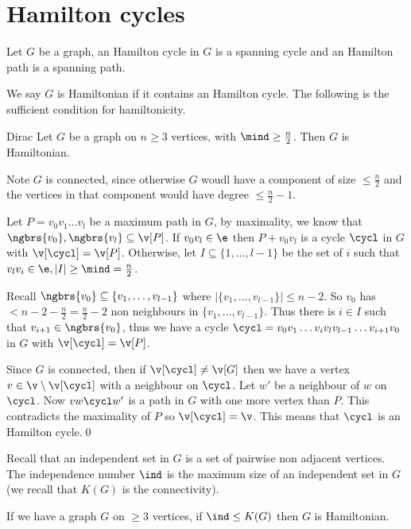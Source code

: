 \chapter{Hamilton cycles}
\begin{definition}
    Let $G$ be a graph, an Hamilton cycle in $G$ is a spanning cycle and an Hamilton path is a spanning path.
\end{definition}
We say $G$ is Hamiltonian if it contains an Hamilton cycle. The following is the sufficient condition for hamiltonicity.
\begin{customtheorem}{Dirac}
\label{theorem:dirac}
    Let $G$ be a graph on $n \geq 3$ vertices, with $\mind \geq \frac{n}{2}$. Then $G$ is Hamiltonian.
\end{customtheorem}
\begin{prf}
    Note $G$ is connected, since otherwise $G$ woudl have a component of size $\leq \frac{n}{2}$ and the vertices in that component would have degree $\leq \frac{n}{2} - 1$.

    Let $P = v_0v_1\dots v_l$ be a maximum path in $G$, by maximality, we know that $\ngbrs{v_0}, \ngbrs{v_l} \subseteq \v[P]$. If $v_0v_l \in \e$ then $P + v_0v_l$ is a cycle $\cycl$ in $G$ with $\v[\cycl] = \v[P]$. Otherwise, let $I \subseteq \{1, \dots, l - 1\}$ be the set of $i$ such that $v_lv_i \in \e, |I| \geq \mind = \frac{n}{2}$.

    Recall $\ngbrs{v_0} \subseteq \{v_1, \dots, v_{l - 1}\}$ where $|\{v_1, \dots, v_{l - 1}\}| \leq n - 2$. So $v_0$ has $< n - 2 - \frac{n}{2} = \frac{n}{2} - 2$ non neighbours in $\{v_1, \dots, v_{l - 1}\}$. Thus there is $i \in I$ such that $v_{i + 1} \in \ngbrs{v_0}$, thus we have a cycle $\cycl = v_0v_1 \dots v_iv_lv_{l - 1} \dots v_{i + 1}v_0$ in $G$ with $\v[\cycl] = \v[P]$.

    Since $G$ is connected, then if $\v[\cycl] \neq \v[G]$ then we have a vertex $v \in \v \setminus \v[\cycl]$ with a neighbour on $\cycl$. Let $w'$ be a neighbour of $w$ on $\cycl$. Now $vw\cycl w'$ is a path in $G$ with one more vertex than $P$. This contradicts the maximality of $P$ so $\v[\cycl] = \v$. This means that $\cycl$ is an Hamilton cycle.\qed
\end{prf}
Recall that an independent set in $G$ is a set of pairwise non adjacent vertices. The independence number $\ind$ is the maximum size of an independent set in $G$ (we recall that $K(G)$ is the connectivity).
\begin{customtheorem}{5.2}
\label{theorem:5.2}
    If we have a graph $G$ on $\geq 3$ vertices, if $\ind \leq K(G)$ then $G$ is Hamiltonian.
\end{customtheorem}
